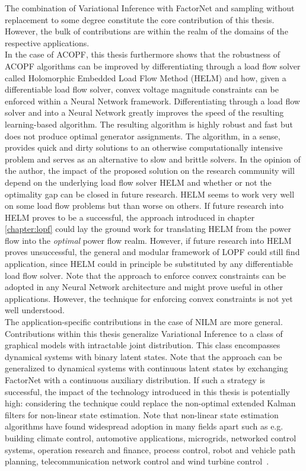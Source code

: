 \documentclass[11pt]{cmuthesis} %
\begin{document}
The combination of Variational Inference with FactorNet and sampling without replacement to some degree constitute the core contribution of this thesis. However, the bulk of contributions are within the realm of the domains of the respective applications.\\

In the case of ACOPF, this thesis furthermore shows that the robustness of ACOPF algorithms can be improved by differentiating through a load flow solver called Holomorphic Embedded Load Flow Method (HELM) and how, given a differentiable load flow solver, convex voltage magnitude constraints can be enforced within a Neural Network framework. Differentiating through a load flow solver and into a Neural Network greatly improves the speed of the resulting learning-based algorithm. The resulting algorithm is highly robust and fast but does not produce optimal generator assignments. The algorithm, in a sense, provides quick and dirty solutions to an otherwise computationally intensive problem and serves as an alternative to slow and brittle solvers. In the opinion of the author, the impact of the proposed solution on the research community will depend on the underlying load flow solver HELM and whether or not the optimality gap can be closed in future research. HELM seems to work very well on some load flow problems but than worse on others. If future research into HELM proves to be a successful, the approach introduced in chapter \ref{chapter:lopf} could lay the ground work for translating HELM from the power flow into the \emph{optimal} power flow realm. However, if future research into HELM proves unsuccessful, the general and modular framework of LOPF could still find application, since HELM could in principle be substituted by any differentiable load flow solver. Note that the approach to enforce convex constraints can be adopted in any Neural Network architecture and might prove useful in other applications. However, the technique for enforcing convex constraints is not yet well understood.\\

The application-specific contributions in the case of NILM are more general. Contributions within this thesis generalize Variational Inference to a class of graphical models with intractable joint distribution. This class encompasses dynamical systems with binary latent states. Note that the approach can be generalized to dynamical systems with continuous latent states by exchanging FactorNet with a continuous auxiliary distribution. If such a strategy is successful, the impact of the technology introduced in this thesis is potentially high: considering the technique could replace the non-optimal extended Kalman filters for non-linear state estimation. Note that non-linear state estimation algorithms have found widespread adoption in many fields apart such as e.g. building climate control, automotive applications, microgrids, networked control systems, operation research and finance, process control, robot and vehicle path planning, telecommunication network control and wind turbine control~\cite{mesbah2016stochastic}.
\end{document}
